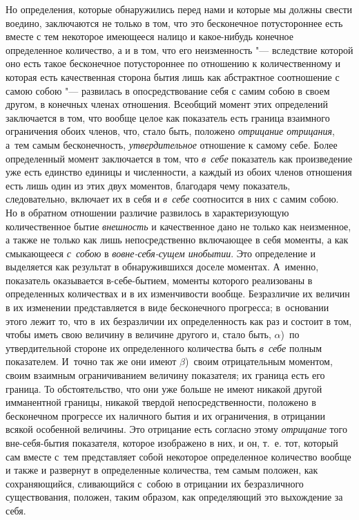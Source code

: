 Но определения, которые обнаружились перед нами и которые мы должны свести
воедино, заключаются не только в том, что это бесконечное потустороннее есть
вместе с тем некоторое имеющееся налицо и какое-нибудь конечное определенное
количество, а и в том, что его неизменность "--- вследствие которой оно есть
такое бесконечное потустороннее по отношению к количественному и которая есть
качественная сторона бытия лишь как абстрактное соотношение с самою собою "---
развилась в опосредствование себя с самим собою в своем другом, в конечных
членах отношения. Всеобщий момент этих определений заключается в том, что
вообще целое как показатель есть граница взаимного ограничения обоих членов,
что, стало быть, положено {\em отрицание отрицания}, а~тем самым бесконечность,
{\em утвердительное} отношение к самому себе. Более определенный момент
заключается в том, что {\em в~себе} показатель как произведение уже есть
единство единицы и численности, а каждый из обоих членов отношения есть лишь
один из этих двух моментов, благодаря чему показатель, следовательно, включает
их в себя и {\em в~себе} соотносится в них с самим собою. Но в обратном
отношении различие развилось в характеризующую количественное бытие
{\em внешность} и качественное дано не только как неизменное, а также не только
как лишь непосредственно включающее в себя моменты, а как смыкающееся
{\em с~собою} в {\em вовне-себя-сущем инобытии}. Это определение и выделяется
как результат в обнаружившихся доселе моментах. А~именно, показатель
оказывается в-себе-бытием, моменты которого реализованы в определенных
количествах и в их изменчивости вообще. Безразличие их величин в их изменении
представляется в виде бесконечного прогресса; в~основании этого лежит то, что
в~их безразличии их определенность как раз и состоит в том, чтобы иметь свою
величину в величине другого и, стало быть, $\alpha$)~по утвердительной стороне
их определенного количества быть {\em в~себе} полным показателем. И~точно так
же они имеют $\beta$)~своим отрицательным моментом, своим взаимным
ограничиванием величину показателя; их граница есть его граница. То
обстоятельство, что они уже больше не имеют никакой другой имманентной границы,
никакой твердой непосредственности, положено в бесконечном
прогрессе их наличного бытия и их ограничения, в отрицании всякой особенной
величины. Это отрицание есть согласно этому {\em отрицание} того вне-себя-бытия
показателя, которое изображено в них, и он, т.~е. тот, который сам вместе с~тем
представляет собой некоторое определенное количество вообще и также и развернут
в определенные количества, тем самым положен, как сохраняющийся, сливающийся
с~собою в отрицании их безразличного существования, положен, таким образом, как
определяющий это выхождение за себя.

